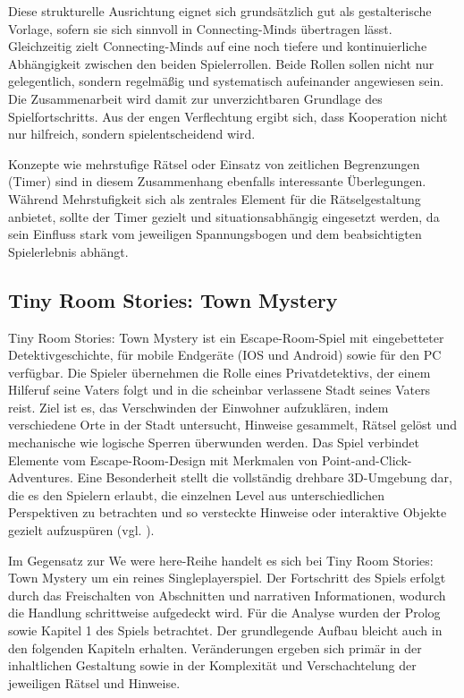 Diese strukturelle Ausrichtung eignet sich grundsätzlich gut als gestalterische Vorlage, sofern sie sich sinnvoll in Connecting-Minds übertragen lässt. Gleichzeitig zielt Connecting-Minds auf eine noch tiefere und kontinuierliche Abhängigkeit zwischen den beiden Spielerrollen. Beide Rollen sollen nicht nur gelegentlich, sondern regelmäßig und systematisch aufeinander angewiesen sein. Die Zusammenarbeit wird damit zur unverzichtbaren Grundlage des Spielfortschritts. Aus der engen Verflechtung ergibt sich, dass Kooperation nicht nur hilfreich, sondern spielentscheidend wird.

Konzepte wie mehrstufige Rätsel oder Einsatz von zeitlichen Begrenzungen (Timer) sind in diesem Zusammenhang ebenfalls interessante Überlegungen. Während Mehrstufigkeit sich als zentrales Element für die Rätselgestaltung anbietet, sollte der Timer gezielt und situationsabhängig eingesetzt werden, da sein Einfluss stark vom jeweiligen Spannungsbogen und dem beabsichtigten Spielerlebnis abhängt.

\subsection{Tiny Room Stories: Town Mystery}
Tiny Room Stories: Town Mystery ist ein Escape-Room-Spiel mit eingebetteter Detektivgeschichte, für mobile Endgeräte (IOS und Android) sowie für den PC verfügbar. Die Spieler übernehmen die Rolle eines Privatdetektivs, der einem Hilferuf seine Vaters folgt und in die scheinbar verlassene Stadt  seines Vaters reist. Ziel ist es, das Verschwinden der Einwohner aufzuklären, indem verschiedene Orte in der Stadt untersucht, Hinweise gesammelt, Rätsel gelöst und mechanische wie logische Sperren überwunden werden. 
Das Spiel verbindet Elemente vom Escape-Room-Design mit Merkmalen von Point-and-Click-Adventures. Eine Besonderheit stellt die vollständig drehbare \ac{3D}-Umgebung dar, die es den Spielern erlaubt, die einzelnen Level aus unterschiedlichen Perspektiven zu betrachten und so versteckte Hinweise oder interaktive Objekte gezielt aufzuspüren (vgl. \citealp{kiary_games_tiny_2021}).

Im Gegensatz zur We were here-Reihe handelt es sich bei Tiny Room Stories: Town Mystery um ein reines Singleplayerspiel. Der Fortschritt des Spiels erfolgt durch das Freischalten von Abschnitten und narrativen Informationen, wodurch die Handlung schrittweise aufgedeckt wird. Für die Analyse wurden der Prolog sowie Kapitel 1 des Spiels betrachtet. Der grundlegende Aufbau bleicht auch in den folgenden Kapiteln erhalten. Veränderungen ergeben sich primär in der inhaltlichen Gestaltung sowie in der Komplexität und Verschachtelung der jeweiligen Rätsel und Hinweise.

